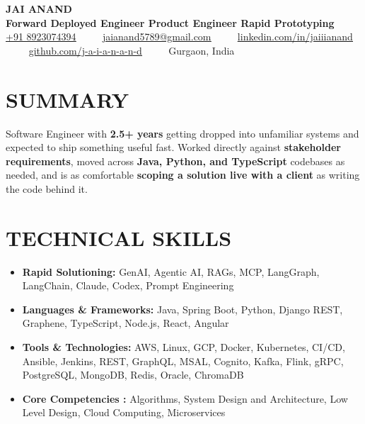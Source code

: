 \documentclass[letterpaper,10pt]{article}
\renewcommand{\normalsize}{%
  \fontsize{10.1}{12.25}\selectfont
}
\begin{document}
\begin{center}
    {\Huge \textbf{JAI ANAND}} \\ \vspace{4pt}
    \large \textbf{Forward Deployed Engineer \textbar{} Product Engineer \textbar{} Rapid Prototyping} \\ \vspace{6pt}
    \small
    \href{tel:+918923074394}{\underline{+91 8923074394}} ~~\textbullet~~ 
    \href{mailto:jaianand5789@gmail.com}{\underline{jaianand5789@gmail.com}} ~~\textbullet~~ 
    \href{https://linkedin.com/in/jaiiianand/}{\underline{linkedin.com/in/jaiiianand}} ~~\textbullet~~ 
    \href{https://github.com/j-a-i-a-n-a-n-d}{\underline{github.com/j-a-i-a-n-a-n-d}} ~~\textbullet~~
    Gurgaon, India
\end{center}

\section{SUMMARY}
Software Engineer with \textbf{2.5+ years} getting dropped into unfamiliar systems and expected to ship something useful fast.  Worked directly against \textbf{stakeholder requirements}, moved across \textbf{Java, Python, and TypeScript} codebases as needed, and is as comfortable \textbf{scoping a solution live with a client} as writing the code behind it.

\section{TECHNICAL SKILLS}
  \begin{itemize}[leftmargin=0.0in, label={}, itemsep=1pt, parsep=0pt, topsep=0pt]
    \item \normalsize{
     \textbf{\normalsize Rapid Solutioning:}{ GenAI, Agentic AI, RAGs, MCP, LangGraph, LangChain, Claude, Codex, Prompt Engineering}
    }
    \item \normalsize{
     \textbf{\normalsize Languages \& Frameworks:}{ Java, Spring Boot, Python, Django REST, Graphene, TypeScript, Node.js, React, Angular}
    }
    \item \normalsize{
     \textbf{\normalsize Tools \& Technologies:}{ AWS, Linux, GCP, Docker, Kubernetes, CI/CD, Ansible, Jenkins, REST, GraphQL, MSAL, Cognito, Kafka, Flink, gRPC, PostgreSQL, MongoDB, Redis, Oracle, ChromaDB}
    }
    \item \normalsize{
     \textbf{\normalsize Core Competencies :}{ Algorithms, System Design and Architecture, Low Level Design, Cloud Computing, Microservices}
    }
  \end{itemize}
\end{document}

